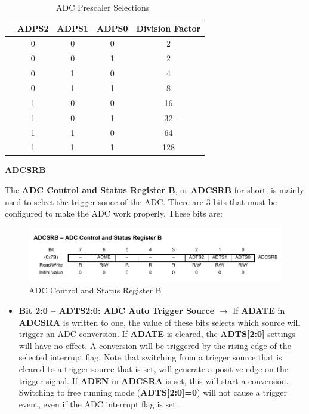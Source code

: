 \begin{table}[H]
    \centering
    \begin{tabular}[t]{lcccc}
        \toprule
        & \textbf{ADPS2} & \textbf{ADPS1} & \textbf{ADPS0} & \textbf{Division Factor}\\
        \midrule
        & 0 & 0 & 0 & 2   \\
        & 0 & 0 & 1 & 2   \\
        & 0 & 1 & 0 & 4   \\
        & 0 & 1 & 1 & 8   \\
        & 1 & 0 & 0 & 16  \\
        & 1 & 0 & 1 & 32  \\
        & 1 & 1 & 0 & 64  \\
        & 1 & 1 & 1 & 128 \\
        \bottomrule
    \end{tabular}
    \caption{ADC Prescaler Selections~\autocite{ATMEGA328P}}
    \label{table:ADC_PRESCALER}
\end{table}

\clearpage

\medskip
\underline{\textbf{ADCSRB}}
\medskip

The \textbf{ADC Control and Status Register B}, or \textbf{ADCSRB} for short, is mainly used to select the trigger souce of the ADC. There are 3 bits that must be configured to make the ADC work properly. These bits are:

\begin{figure}[H]
    \centering
    \includegraphics[width = \textwidth]{Graphics/MICROS/Practice 3/DATASHEET/ADCSRB_2.pdf}
    \caption{ADC Control and Status Register B~\autocite{ATMEGA328P}}
    \label{fig:ADCSRB}
\end{figure}

\begin{itemize}
    \item \textbf{Bit 2:0 – ADTS2:0: ADC Auto Trigger Source} $\bm{\rightarrow}$ If \textbf{ADATE} in \textbf{ADCSRA} is written to one, the value of these bits selects which source will trigger an ADC conversion. If \textbf{ADATE} is cleared, the \textbf{ADTS[2:0]} settings will have no effect. A conversion will be triggered by the rising edge of the selected interrupt flag. Note that switching from a trigger source that is cleared to a trigger source that is set, will generate a positive edge on the trigger signal. If \textbf{ADEN} in \textbf{ADCSRA} is set, this will start a conversion. Switching to free running mode (\textbf{ADTS[2:0]=0}) will not cause a trigger event, even if the ADC interrupt flag is set.
\end{itemize}


